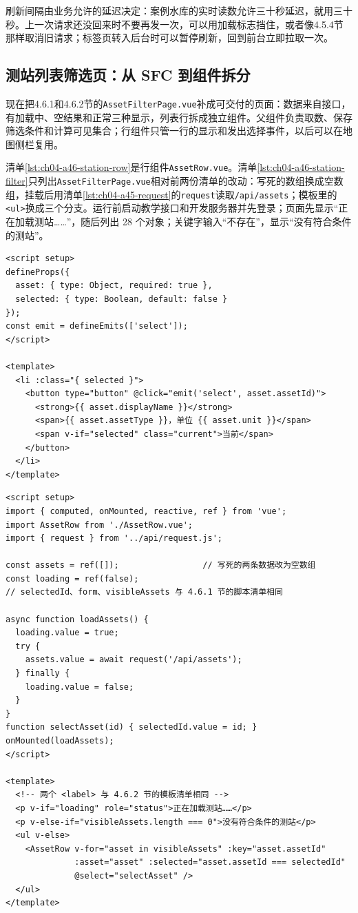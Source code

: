 刷新间隔由业务允许的延迟决定：案例水库的实时读数允许三十秒延迟，就用三十秒。上一次请求还没回来时不要再发一次，可以用加载标志挡住，或者像4.5.4节那样取消旧请求；标签页转入后台时可以暂停刷新，回到前台立即拉取一次。

\subsection{测站列表筛选页：从 SFC 到组件拆分}

现在把4.6.1和4.6.2节的\texttt{AssetFilterPage.vue}补成可交付的页面：数据来自接口，有加载中、空结果和正常三种显示，列表行拆成独立组件。父组件负责取数、保存筛选条件和计算可见集合；行组件只管一行的显示和发出选择事件，以后可以在地图侧栏复用。

清单\ref{lst:ch04-a46-station-row}是行组件\texttt{AssetRow.vue}。清单\ref{lst:ch04-a46-station-filter}只列出\texttt{AssetFilterPage.vue}相对前两份清单的改动：写死的数组换成空数组，挂载后用清单\ref{lst:ch04-a45-request}的\texttt{request}读取\texttt{/api/assets}；模板里的\texttt{<ul>}换成三个分支。运行前启动教学接口和开发服务器并先登录；页面先显示“正在加载测站……”，随后列出 28 个对象；关键字输入“不存在”，显示“没有符合条件的测站”。

\begin{lstlisting}[label={lst:ch04-a46-station-row},language=Vue,caption={测站列表行组件 AssetRow.vue}]
<script setup>
defineProps({
  asset: { type: Object, required: true },
  selected: { type: Boolean, default: false }
});
const emit = defineEmits(['select']);
</script>

<template>
  <li :class="{ selected }">
    <button type="button" @click="emit('select', asset.assetId)">
      <strong>{{ asset.displayName }}</strong>
      <span>{{ asset.assetType }}，单位 {{ asset.unit }}</span>
      <span v-if="selected" class="current">当前</span>
    </button>
  </li>
</template>
\end{lstlisting}

\begin{lstlisting}[label={lst:ch04-a46-station-filter},language=Vue,caption={AssetFilterPage.vue 的改动：接口取数、三种显示与行组件}]
<script setup>
import { computed, onMounted, reactive, ref } from 'vue';
import AssetRow from './AssetRow.vue';
import { request } from '../api/request.js';

const assets = ref([]);                 // 写死的两条数据改为空数组
const loading = ref(false);
// selectedId、form、visibleAssets 与 4.6.1 节的脚本清单相同

async function loadAssets() {
  loading.value = true;
  try {
    assets.value = await request('/api/assets');
  } finally {
    loading.value = false;
  }
}
function selectAsset(id) { selectedId.value = id; }
onMounted(loadAssets);
</script>

<template>
  <!-- 两个 <label> 与 4.6.2 节的模板清单相同 -->
  <p v-if="loading" role="status">正在加载测站……</p>
  <p v-else-if="visibleAssets.length === 0">没有符合条件的测站</p>
  <ul v-else>
    <AssetRow v-for="asset in visibleAssets" :key="asset.assetId"
              :asset="asset" :selected="asset.assetId === selectedId"
              @select="selectAsset" />
  </ul>
</template>
\end{lstlisting}

